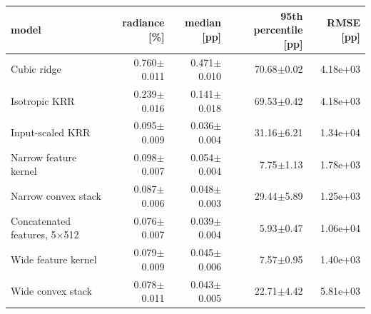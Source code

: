 \begin{tabular}{lrrrr}
\toprule
model & radiance [\%] & median [pp] & 95th percentile [pp] & RMSE [pp] \\
\midrule
Cubic ridge & 0.760$\pm$0.011 & 0.471$\pm$0.010 & 70.68$\pm$0.02 & 4.18e+03 \\
Isotropic KRR & 0.239$\pm$0.016 & 0.141$\pm$0.018 & 69.53$\pm$0.42 & 4.18e+03 \\
Input-scaled KRR & 0.095$\pm$0.009 & 0.036$\pm$0.004 & 31.16$\pm$6.21 & 1.34e+04 \\
Narrow feature kernel & 0.098$\pm$0.007 & 0.054$\pm$0.004 & 7.75$\pm$1.13 & 1.78e+03 \\
Narrow convex stack & 0.087$\pm$0.006 & 0.048$\pm$0.003 & 29.44$\pm$5.89 & 1.25e+03 \\
Concatenated features, 5$\times$512 & 0.076$\pm$0.007 & 0.039$\pm$0.004 & 5.93$\pm$0.47 & 1.06e+04 \\
Wide feature kernel & 0.079$\pm$0.009 & 0.045$\pm$0.006 & 7.57$\pm$0.95 & 1.40e+03 \\
Wide convex stack & 0.078$\pm$0.011 & 0.043$\pm$0.005 & 22.71$\pm$4.42 & 5.81e+03 \\
\bottomrule
\end{tabular}

